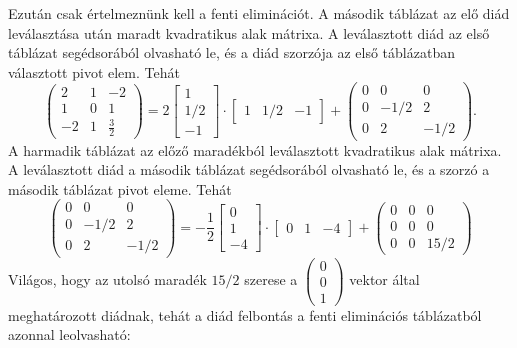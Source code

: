 \documentclass[9pt, a4paper, showtrims]{memoir}
\theoremstyle{plain}
\theoremstyle{remark}
\theoremstyle{definition}
\begin{document}
Ezután csak értelmeznünk kell a fenti eliminációt.
A második táblázat az elő diád leválasztása után maradt kvadratikus alak mátrixa.
A leválasztott diád az első táblázat segédsorából olvasható le, 
és a diád szorzója az első táblázatban választott pivot elem.
Tehát
\[
    \begin{pmatrix}
        2&1&-2\\
        1&0&1\\
        -2&1&\frac{3}{2}
    \end{pmatrix}
    =
    2
    \begin{bmatrix}
        1\\1/2\\-1
    \end{bmatrix}
    \cdot
    \begin{bmatrix}
        1&1/2&-1
    \end{bmatrix}
    +
    \begin{pmatrix}
        0&0&0\\
        0&-1/2&2\\
        0&2&-1/2
    \end{pmatrix}.
\]
A harmadik táblázat az előző maradékból leválasztott kvadratikus alak mátrixa.
A leválasztott diád a második táblázat segédsorából olvasható le, 
és a szorzó a második táblázat pivot eleme.
Tehát
\[
    \begin{pmatrix}
        0&0&0\\
        0&-1/2&2\\
        0&2&-1/2
    \end{pmatrix}
    =
    -\frac{1}{2}
    \begin{bmatrix}
        0\\1\\-4
    \end{bmatrix}
    \cdot
    \begin{bmatrix}
        0&1&-4
    \end{bmatrix}
    +
    \begin{pmatrix}
        0&0&0\\
        0&0&0\\
        0&0&15/2
    \end{pmatrix}
\]
Világos, hogy az utolsó maradék $15/2$ szerese a 
\(
\begin{pmatrix}
    0\\0\\1
\end{pmatrix}
\)
vektor által meghatározott diádnak, tehát a diád felbontás a fenti eliminációs táblázatból azonnal leolvasható:
\end{document}
